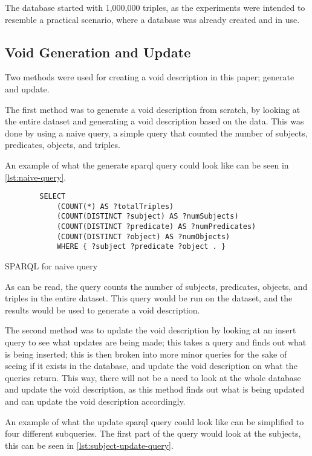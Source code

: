 The database started with 1,000,000 triples, as the experiments were intended to resemble a practical scenario, where a database was already created and in use.
\subsection{Void Generation and Update}\label{sec:void}
Two methods were used for creating a \gls{void} description in this paper; generate and update.

The first method was to generate a \gls{void} description from scratch, by looking at the entire dataset and generating a \gls{void} description based on the data. This was done by using a naive query, a simple query that counted the number of subjects, predicates, objects, and triples.

An example of what the generate \gls{sparql} query could look like can be seen in \autoref{lst:naive-query}.


\begin{listing}[htb!]
    \begin{verbatim}          
        SELECT
            (COUNT(*) AS ?totalTriples)
            (COUNT(DISTINCT ?subject) AS ?numSubjects)
            (COUNT(DISTINCT ?predicate) AS ?numPredicates)
            (COUNT(DISTINCT ?object) AS ?numObjects)
            WHERE { ?subject ?predicate ?object . }
    \end{verbatim}
    \caption{SPARQL for naive query}
    \label{lst:naive-query}
\end{listing}

As can be read, the query counts the number of subjects, predicates, objects, and triples in the entire dataset. This query would be run on the dataset, and the results would be used to generate a \gls{void} description.


The second method was to update the \gls{void} description by looking at an insert query to see what updates are being made; this takes a query and finds out what is being inserted; this is then broken into more minor queries for the sake of seeing if it exists in the database, and update the \gls{void} description on what the queries return. This way, there will not be a need to look at the whole database and update the \gls{void} description, as this method finds out what is being updated and can update the \gls{void} description accordingly.

An example of what the update \gls{sparql} query could look like can be simplified to four different subqueries. The first part of the query would look at the subjects, this can be seen in \autoref{lst:subject-update-query}.

